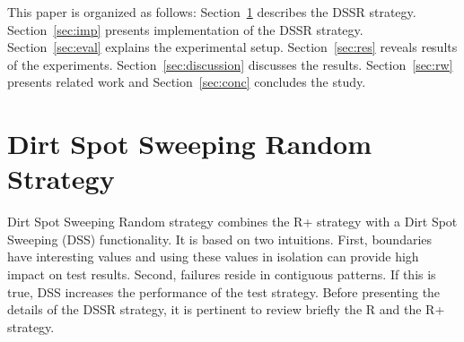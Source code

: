 \documentclass[conference]{IEEEtran}
\begin{document}

\noindent This paper is organized as follows: Section~\ref{sec:dssr} describes the DSSR strategy. Section~\ref{sec:imp} presents implementation of the DSSR strategy. Section~\ref{sec:eval} explains the experimental setup. Section~\ref{sec:res} reveals results of the experiments. Section~\ref{sec:discussion} discusses the results. Section~\ref{sec:rw} presents related work and Section~\ref{sec:conc} concludes the study.





\section{Dirt Spot Sweeping Random Strategy}\label{sec:dssr}
\noindent Dirt Spot Sweeping Random strategy combines the R+ strategy with a Dirt Spot Sweeping (DSS) functionality. It is based on two intuitions. First, boundaries have interesting values and using these values in isolation can provide high impact on test results. Second, failures reside in contiguous patterns. If this is true, DSS increases the performance of the test strategy. Before presenting the details of the DSSR strategy, it is pertinent to review briefly the R and the R+ strategy.
\end{document}
